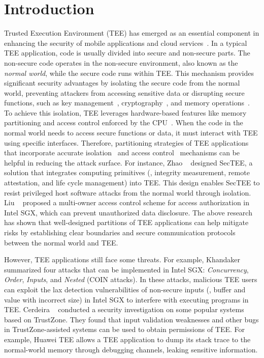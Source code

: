 \section{Introduction} \label{s:intro}
Trusted Execution Environment (TEE) has emerged as an essential component in enhancing the security of mobile applications and cloud services~\cite{10738357, 10.1145/2541940.2541949, 9693116}.
In a typical TEE application, code is usually divided into secure and non-secure parts. The non-secure code operates in the non-secure environment, also known as the \textit{normal world}, while the secure code runs within TEE.
This mechanism provides significant security advantages by isolating the secure code from the normal world, preventing attackers from accessing sensitive data or disrupting secure functions, such as key management~\cite{8359163, 9024053}, cryptography~\cite{10745433, mark2021rvtee}, and memory operations~\cite{DBLP:conf/ndss/ZhaoM19, 10.1145/3620665.3640378}.
To achieve this isolation, TEE leverages hardware-based features like memory partitioning and access control enforced by the CPU~\cite{10646815, 10.1002/cpe.4130}.
When the code in the normal world needs to access secure functions or data, it must interact with TEE using specific interfaces.
Therefore, partitioning strategies of TEE applications that incorporate accurate isolation~\cite{10.1145/3319535.3363205, 10.1145/2382196.2382214, DBLP:conf/ndss/KimKCGL0X18} and access control~\cite{9925586, 10.1145/2382196.2382214} mechanisms can be helpful in reducing the attack surface.
For instance, Zhao \etal~\cite{10.1145/3319535.3363205} designed SecTEE, a solution that integrates computing primitives (\eg, integrity measurement, remote attestation, and life cycle management) into TEE.
This design enables SecTEE to resist privileged host software attacks from the normal world through isolation.
Liu \etal~\cite{9925586} proposed a multi-owner access control scheme for access authorization in Intel SGX, which can prevent unauthorized data disclosure.
The above research has shown that well-designed partitions of TEE applications can help mitigate risks by establishing clear boundaries and secure communication protocols between the normal world and TEE.

However, TEE applications still face some threats. For example, Khandaker \etal~\cite{10.1145/3373376.3378486} summarized four attacks that can be implemented in Intel SGX: \textit{Concurrency}, \textit{Order}, \textit{Inputs}, and \textit{Nested} (COIN attacks).
In these attacks, malicious TEE users can exploit the lax detection vulnerabilities of non-secure inputs (\eg, buffer and value with incorrect size) in Intel SGX to interfere with executing programs in TEE.
Cerdeira \etal~\cite{9152801} conducted a security investigation on some popular systems based on TrustZone.
They found that input validation weaknesses and other bugs in TrustZone-assisted systems can be used to obtain permissions of TEE. For example, Huawei TEE allows a TEE application to dump its stack trace to the normal-world memory through debugging channels, leaking sensitive information.

